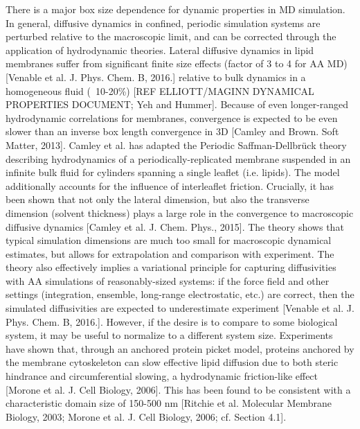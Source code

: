 \documentclass[9pt,bestpractices]{livecoms}
\begin{document}
There is a major box size dependence for dynamic properties in MD simulation.
In general, diffusive dynamics in confined, periodic simulation systems are perturbed relative to the macroscopic limit, and can be corrected through the application of hydrodynamic theories.
Lateral diffusive dynamics in lipid membranes suffer from significant finite size effects (factor of 3 to 4 for AA MD) [Venable et al. J. Phys. Chem. B, 2016.] relative to bulk dynamics in a homogeneous fluid (~10-20\%) [REF ELLIOTT/MAGINN DYNAMICAL PROPERTIES DOCUMENT; Yeh and Hummer].
Because of even longer-ranged hydrodynamic correlations for membranes, convergence is expected to be even slower than an inverse box length convergence in 3D [Camley and Brown. Soft Matter, 2013].
Camley et al. has adapted the Periodic Saffman-Dellbr\"uck theory describing hydrodynamics of a periodically-replicated membrane suspended in an infinite bulk fluid for cylinders spanning a single leaflet (i.e. lipids).
The model additionally accounts for the influence of interleaflet friction.
Crucially, it has been shown that not only the lateral dimension, but also the transverse dimension (solvent thickness) plays a large role in the convergence to macroscopic diffusive dynamics [Camley et al. J. Chem. Phys., 2015].
The theory shows that typical simulation dimensions are much too small for macroscopic dynamical estimates, but allows for extrapolation and comparison with experiment.
The theory also effectively implies a variational principle for capturing diffusivities with AA simulations of reasonably-sized systems: if the force field and other settings (integration, ensemble, long-range electrostatic, etc.) are correct, then the simulated diffusivities are expected to underestimate experiment [Venable et al. J. Phys. Chem. B, 2016.].
However, if the desire is to compare to some biological system, it may be useful to normalize to a different system size.
Experiments have shown that, through an anchored protein picket model, proteins anchored by the membrane cytoskeleton can slow effective lipid diffusion due to both steric hindrance and circumferential slowing, a hydrodynamic friction-like effect [Morone et al. J. Cell Biology, 2006].
This has been found to be consistent with a characteristic domain size of 150-500 nm [Ritchie et al. Molecular Membrane Biology, 2003; Morone et al. J. Cell Biology, 2006; cf. Section 4.1].
\end{document}
